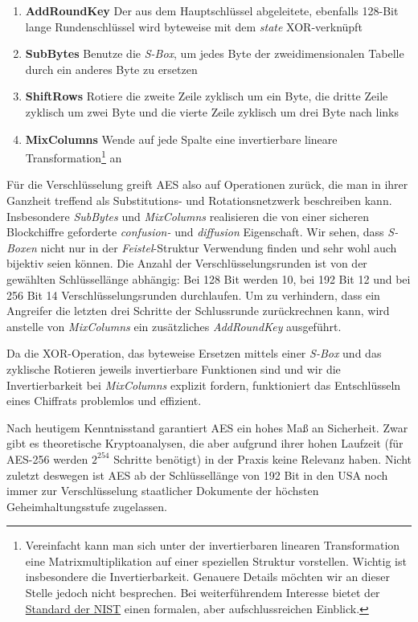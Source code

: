 \begin{enumerate}
	\item \textbf{AddRoundKey} \small{Der aus dem Hauptschlüssel abgeleitete, ebenfalls 128-Bit lange Rundenschlüssel wird byteweise mit dem \textit{state} XOR-verknüpft}
	\item \textbf{SubBytes} \small{Benutze die \textit{S-Box}, um jedes Byte der zweidimensionalen Tabelle durch ein anderes Byte zu ersetzen}
	\item \textbf{ShiftRows} \small{Rotiere die zweite Zeile zyklisch um ein Byte, die dritte Zeile zyklisch um zwei Byte und die vierte Zeile zyklisch um drei Byte nach links}
	\item \textbf{MixColumns} \small{Wende auf jede Spalte eine invertierbare lineare Transformation\footnote{Vereinfacht kann man sich unter der invertierbaren linearen Transformation eine Matrixmultiplikation auf einer speziellen Struktur vorstellen. Wichtig ist insbesondere die Invertierbarkeit. Genauere Details möchten wir an dieser Stelle jedoch nicht besprechen. Bei weiterführendem Interesse bietet der \href{http://csrc.nist.gov/publications/fips/fips197/fips-197.pdf}{Standard der NIST} einen formalen, aber aufschlussreichen Einblick.} an}
\end{enumerate}

Für die Verschlüsselung greift AES also auf Operationen zurück, die man in ihrer Ganzheit treffend als Substitutions- und Rotationsnetzwerk beschreiben kann. Insbesondere \textit{SubBytes} und \textit{MixColumns} realisieren die von einer sicheren Blockchiffre geforderte \textit{confusion-} und \textit{diffusion} Eigenschaft. Wir sehen, dass \textit{S-Boxen} nicht nur in der \textit{Feistel}-Struktur Verwendung finden und sehr wohl auch bijektiv seien können.
Die Anzahl der Verschlüsselungsrunden ist von der gewählten Schlüssellänge abhängig: Bei 128 Bit werden 10, bei 192 Bit 12 und bei 256 Bit 14 Verschlüsselungsrunden durchlaufen. Um zu verhindern, dass ein Angreifer die letzten drei Schritte der Schlussrunde zurückrechnen kann, wird anstelle von \textit{MixColumns} ein zusätzliches \textit{AddRoundKey} ausgeführt.

Da die XOR-Operation, das byteweise Ersetzen mittels einer \textit{S-Box} und das zyklische Rotieren jeweils invertierbare Funktionen sind und wir die Invertierbarkeit bei \textit{MixColumns} explizit fordern, funktioniert das Entschlüsseln eines Chiffrats problemlos und effizient.

Nach heutigem Kenntnisstand garantiert AES ein hohes Maß an Sicherheit. Zwar gibt es theoretische Kryptoanalysen, die aber aufgrund ihrer hohen Laufzeit (für AES-256 werden $2^{254}$ Schritte benötigt) in der Praxis keine Relevanz haben. Nicht zuletzt deswegen ist AES ab der Schlüssellänge von 192 Bit in den USA noch immer zur Verschlüsselung staatlicher Dokumente der höchsten Geheimhaltungsstufe zugelassen.

